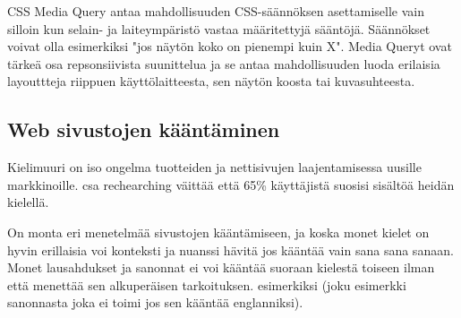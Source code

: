 \documentclass[11pt,a4paper,titlepage,oneside]{article}
\begin{document}
\medskip




CSS Media Query antaa mahdollisuuden CSS-säännöksen asettamiselle vain silloin kun selain- ja laiteympäristö vastaa määritettyjä sääntöjä. 
Säännökset voivat olla esimerkiksi "jos näytön koko on pienempi kuin X".
Media Queryt ovat tärkeä osa repsonsiivista suunittelua ja se antaa mahdollisuuden luoda erilaisia layouttteja riippuen käyttölaitteesta,
sen näytön koosta tai kuvasuhteesta.
















\newpage
\subsection{Web sivustojen kääntäminen}








Kielimuuri on iso ongelma tuotteiden ja nettisivujen laajentamisessa uusille markkinoille.
csa rechearching väittää että 65\% käyttäjistä suosisi sisältöä heidän kielellä.
\medskip






On monta eri menetelmää sivustojen kääntämiseen, 
ja koska monet kielet on hyvin erillaisia voi konteksti ja nuanssi hävitä jos kääntää vain sana sana sanaan.
Monet lausahdukset ja sanonnat ei voi kääntää suoraan kielestä toiseen ilman että menettää sen alkuperäisen tarkoituksen.
esimerkiksi (joku esimerkki sanonnasta joka ei toimi jos sen kääntää englanniksi).
\medskip
\end{document}
